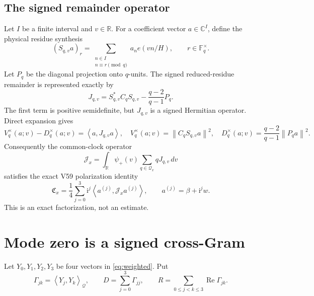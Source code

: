 \documentclass[11pt]{article}
\newcommand{\ip}[2]{\left\langle #1,#2\right\rangle}
\newcommand{\norm}[1]{\left\lVert #1\right\rVert}
\newcommand{\ii}{\mathrm i}
\newcommand{\Qp}{\mathcal Q}
\begin{document}
\subsection{The signed remainder operator}
Let \(I\) be a finite interval and \(v\in\mathbb R\).  For a coefficient
vector \(a\in\mathbb C^I\), define the physical residue synthesis
\begin{equation}
(S_{q,v}a)_r=\sum_{\substack{n\in I\\n\equiv r\pmod q}}
a_n e(vn/H),\qquad r\in\mathbb F_q^\times.
\label{eq:synthesis}
\end{equation}
Let \(P_q\) be the diagonal projection onto \(q\)-units.  The signed
reduced-residue remainder is represented exactly by
\begin{equation}
J_{q,v}=S_{q,v}^{*}C_qS_{q,v}
-\frac{q-2}{q-1}P_q.
\label{eq:J}
\end{equation}
The first term is positive semidefinite, but \(J_{q,v}\) is a signed
Hermitian operator.  Direct expansion gives
\begin{equation}
V_q^\times(a;v)-D_q^\times(a;v)
=\ip{a}{J_{q,v}a},\quad
V_q^\times(a;v)=\norm{C_qS_{q,v}a}^2,\quad
D_q^\times(a;v)=\frac{q-2}{q-1}\norm{P_qa}^2.
\label{eq:remainder}
\end{equation}
Consequently the common-clock operator
\begin{equation}
\mathcal J_x=\int_{\mathbb R}\psi_+(v)
\sum_{q\in\mathcal Q_x}qJ_{q,v}\,dv
\label{eq:Jglobal}
\end{equation}
satisfies the exact V59 polarization identity
\begin{equation}
\mathfrak C_x=\frac14\sum_{j=0}^3\ii^j
\ip{a^{(j)}}{\mathcal J_xa^{(j)}},
\qquad a^{(j)}=\beta+\ii^jw.
\label{eq:polarizedJ}
\end{equation}
This is an exact factorization, not an estimate.

\section{Mode zero is a signed cross-Gram}
Let \(Y_0,Y_1,Y_2,Y_3\) be four vectors in \eqref{eq:weighted}.  Put
\begin{equation}
\Gamma_{jk}=\ip{Y_j}{Y_k}_{\Qp},\qquad
D=\sum_{j=0}^3\Gamma_{jj},\qquad
R=\sum_{0\leq j<k\leq3}\operatorname{Re}\Gamma_{jk}.
\label{eq:gram}
\end{equation}
\end{document}
